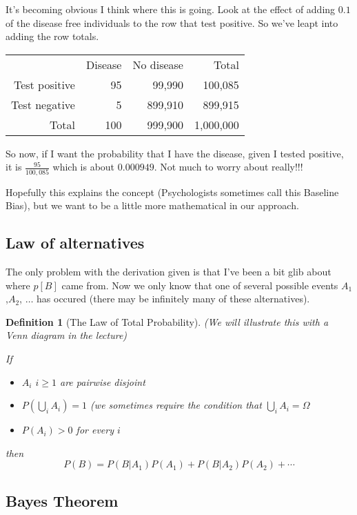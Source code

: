 \documentclass[12pt]{extbook}
\newtheorem{df}{Definition}[section]
\begin{document}
It's becoming obvious I think where this is going.   Look at the effect of adding $0.1$ of the disease free individuals to the row that test positive.  So we've leapt into adding the row totals.

\begin{tabular}{rrrr}
 & Disease & No disease & Total \\
Test positive & 95 & 99,990 & 100,085 \\
Test negative & 5 & 899,910 & 899,915 \\
Total & 100 & 999,900 & 1,000,000
\end{tabular}


So now, if I want the probability that I have the disease, given I tested positive, it is $\frac{95}{100,085}$ which is about $0.000949$.    Not much to worry about really!!!

Hopefully this explains the concept (Psychologists sometimes call this Baseline Bias), but we want to be a little more mathematical in our approach.



\subsection{Law of alternatives}

The only problem with the derivation given is that I've been a bit glib about where $p[B]$ came from.   Now we only know that one of several possible events $A_1$,$A_2$, $\ldots$ has occured (there may be infinitely many of these alternatives).

\begin{df}[The Law of Total Probability]

(We will illustrate this with a Venn diagram in the lecture)

If
\begin{itemize}
\item $A_i$ $i \geq 1$ are pairwise disjoint
\item $P(\bigcup_i A_i)=1$ (we sometimes require the condition that $\bigcup_i A_i = \Omega$
\item $P(A_i)>0$ for every $i$
\end{itemize}
then
\begin{displaymath}
P(B)=P(B|A_1)P(A_1) + P(B|A_2)P(A_2) + \cdots
\end{displaymath}

\end{df}

 
\subsection{Bayes Theorem}
\end{document}
